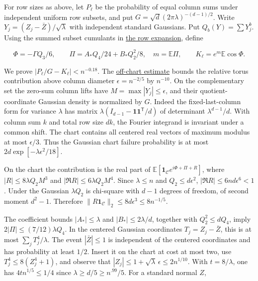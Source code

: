 \documentclass[11pt]{article}
\begin{document}
For row sizes as above, let $P_{\ell}$ be the probability of equal column sums under independent uniform row subsets, and put $G=\sqrt d(2\pi\lambda)^{-(d-1)/2}$. Write $Y_j=(Z_j-\bar Z)/\sqrt\lambda$ with independent standard Gaussians. Put $Q_b(Y)=\sum Y_j^b$. Using the summed subset cumulants in \href{https://github.com/ProgramComputer/open-math-research/blob/main/topics/balanced-arrays/effective-sublinear/direct-row-expansion.md}{the row expansion}, define

\[
\Phi=-\Gamma Q_3/6,\qquad \Pi=A_{\ast} Q_4/24+B_{\ast}Q_2^2/8,\quad m=\mathbb E\Pi,\qquad K_{\ell}=e^m\mathbb E\cos\Phi .
\]

We prove $|P_{\ell}/G-K_{\ell}|<n^{-0.18}$. The \href{https://github.com/ProgramComputer/open-math-research/blob/main/topics/balanced-arrays/effective-sublinear/direct-row-tail.md}{off-chart estimate} bounds the relative torus contribution above column diameter $\epsilon=n^{-2/5}$ by $n^{-10}$. On the complementary set the zero-sum column lifts have $M=\max|Y_j|\le\epsilon$, and their quotient-coordinate Gaussian density is normalized by $G$. Indeed the fixed-last-column form for variance $\lambda$ has matrix $\lambda(I_{d-1}-\mathbf1\mathbf1^{\mathsf T}/d)$ of determinant $\lambda^{d-1}/d$. With column sum $k$ and total row size $dk$, the Fourier integrand is invariant under a common shift. The chart contains all centered real vectors of maximum modulus at most $\epsilon/3$. Thus the Gaussian chart failure probability is at most $2d\exp[-\lambda\epsilon^2/18]$.

On the chart the contribution is the real part of $\mathbb E[\mathbf1_{\mathcal C}e^{i\Phi+\Pi+R}]$, where $|R|\le8\lambda Q_2M^3$ and $|\Re R|\le6\lambda Q_2M^4$. Since $\lambda\le n$ and $Q_2\le d\epsilon^2$, $|\Re R|\le6nd\epsilon^6<1$. Under the Gaussian $\lambda Q_2$ is chi-square with $d-1$ degrees of freedom, of second moment $d^2-1$. Therefore $\|R\mathbf1_{\mathcal C}\|_2\le8d\epsilon^3\le8n^{-1/5}$.

The coefficient bounds $|A_{\ast}|\le\lambda$ and $|B_{\ast}|\le2\lambda/d$, together with $Q_2^2\le dQ_4$, imply $2|\Pi|\le(7/12)\lambda Q_4$. In the centered Gaussian coordinates $T_j=Z_j-\bar Z$, this is at most $\sum_j T_j^4/\lambda$. The event $|\bar Z|\le1$ is independent of the centered coordinates and has probability at least $1/2$. Insert it on the chart at cost at most two, use $T_j^4\le8(Z_j^4+1)$, and observe that $|Z_j|\le1+\sqrt\lambda\,\epsilon\le2n^{1/10}$. With $t=8/\lambda$, one has $4tn^{1/5}\le1/4$ since $\lambda\ge d/5\ge n^{.99}/5$. For a standard normal $Z$,
\end{document}
